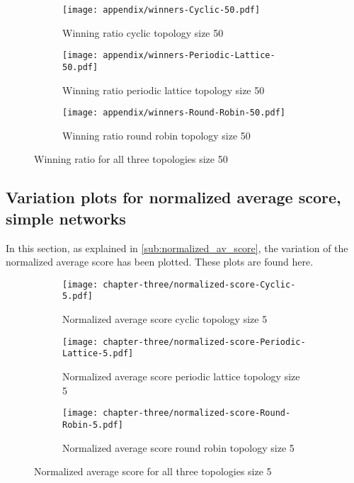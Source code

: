 \begin{figure}[H]
	\centering
	\begin{subfigure}[t]{0.65\textwidth}
		\centering
		\texttt{[image: appendix/winners-Cyclic-50.pdf]}
		\caption{Winning ratio cyclic topology size 50}
	\end{subfigure}
	\hfill
	\begin{subfigure}[t]{0.65\textwidth}\centering
		\centering
		\texttt{[image: appendix/winners-Periodic-Lattice-50.pdf]}
		\caption{Winning ratio periodic lattice topology size 50}
	\end{subfigure}
	\hfill
	\begin{subfigure}[t]{0.65\textwidth}\centering
		\centering
		\texttt{[image: appendix/winners-Round-Robin-50.pdf]}
		\caption{Winning ratio round robin topology size 50}
	\end{subfigure}
	\caption{Winning ratio for all three topologies size 50}
	\label{fig:winning-fifty}
\end{figure}

\newpage
\subsection{Variation plots for normalized average score, simple networks}
\label{append:variation-plots}
In this section, as explained in \autoref{sub:normalized_av_score}, the variation of the
normalized average score has been plotted. These plots are found here.

\begin{figure}[H]
	\centering
	\begin{subfigure}[t]{0.65\textwidth}
		\centering
		\texttt{[image: chapter-three/normalized-score-Cyclic-5.pdf]}
		\caption{Normalized average score cyclic topology size 5}
	\end{subfigure}
	\hfill
	\begin{subfigure}[t]{0.65\textwidth}\centering
		\centering
		\texttt{[image: chapter-three/normalized-score-Periodic-Lattice-5.pdf]}
		\caption{Normalized average score periodic lattice topology size 5}
	\end{subfigure}
	\hfill
	\begin{subfigure}[t]{0.65\textwidth}\centering
		\centering
		\texttt{[image: chapter-three/normalized-score-Round-Robin-5.pdf]}
		\caption{Normalized average score round robin topology size 5}
	\end{subfigure}
	\caption{Normalized average score for all three topologies size 5}
	\label{fig:average-score-five}
\end{figure}

